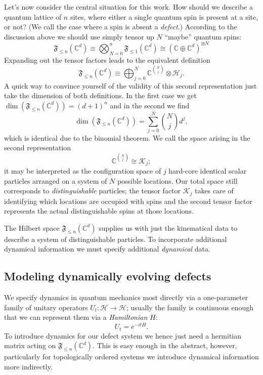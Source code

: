 Let's now consider the central situation for this work. How should we describe a quantum lattice of $n$ sites, where either a single quantum spin is present at a site, or not? (We call the case where a spin is absent a \emph{defect}.) According to the discussion above we should use simply tensor up $N$ ``maybe'' quantum spins:
\begin{equation}
	\mathfrak{F}_{\le n}(\mathbb{C}^d) \equiv \bigotimes_{N=0}^n \mathfrak{F}_{\le 1}(\mathbb{C}^d) \cong (\mathbb{C}\oplus \mathbb{C}^d)^{\otimes N}
\end{equation}
Expanding out the tensor factors leads to the equivalent definition
\begin{equation}
	\mathfrak{F}_{\le n}(\mathbb{C}^d) \equiv \bigoplus_{j=0}^N \mathbb{C}^{\binom{N}{j}}\otimes \mathcal{H}_j.
\end{equation}
A quick way to convince yourself of the validity of this second representation just take the dimension of both definitions. In the first case we get $\dim(\mathfrak{F}_{\le n}(\mathbb{C}^d)) = (d+1)^n$ and in the second we find
\begin{equation}
	\dim(\mathfrak{F}_{\le n}(\mathbb{C}^d)) = \sum_{j=0}^N \binom{N}{j} d^j,
\end{equation}
which is identical due to the binomial theorem. We call the space arising in the second representation
\begin{equation}
	\mathbb{C}^{\binom{N}{j}} \cong \mathcal{K}_{j};
\end{equation}
it may be interpreted as the configuration space of $j$ hard-core identical scalar particles arranged on a system of $N$ possible locations. Our total space still corresponds to \emph{distinguishable} particles; the tensor factor $\mathcal{K}_j$ takes care of identifying which locations are occupied with spins and the second tensor factor represents the actual distinguishable spins at those locations.

The Hilbert space $\mathfrak{F}_{\le n}(\mathbb{C}^d)$ supplies us with just the kinematical data to describe a system of distinguishable particles. To incorporate additional dynamical information we must specify additional \emph{dynamical} data.

\subsection{Modeling dynamically evolving defects}
We specify dynamics in quantum mechanics most directly via a one-parameter family of unitary operators $U_t:\mathcal{H}\rightarrow\mathcal{H}$; usually the family is continuous enough that we can represent them via a \emph{Hamiltonian} $H$:
\begin{equation}
	U_t = e^{-it H}.
\end{equation}
To introduce dynamics for our defect system we hence just need a hermitian matrix acting on $\mathfrak{F}_{\le n}(\mathbb{C}^d)$. This is easy enough in the abstract, however, particularly for topologically ordered systems we introduce dynamical information more indirectly.


